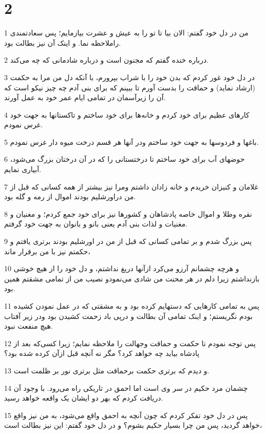 \chapter{2}

\par 1 من در دل خود گفتم: الان بیا تا تو را به عیش و عشرت بیازمایم؛ پس سعادتمندی راملاحظه نما. و اینک آن نیز بطالت بود.
\par 2 درباره خنده گفتم که مجنون است و درباره شادمانی که چه می‌کند.
\par 3 در دل خود غور کردم که بدن خود را با شراب بپرورم، با آنکه دل من مرا به حکمت (ارشاد نماید) و حماقت را بدست آورم تا ببینم که برای بنی آدم چه چیز نیکو است که آن را زیرآسمان در تمامی ایام عمر خود به عمل آورند.
\par 4 کارهای عظیم برای خود کردم و خانه‌ها برای خود ساختم و تاکستانها به جهت خود غرس نمودم.
\par 5 باغها و فردوسها به جهت خود ساختم ودر آنها هر قسم درخت میوه دار غرس نمودم.
\par 6 حوضهای آب برای خود ساختم تا درختستانی را که در آن درختان بزرگ می‌شود، آبیاری نمایم.
\par 7 غلامان و کنیزان خریدم و خانه زادان داشتم ومرا نیز بیشتر از همه کسانی که قبل از من دراورشلیم بودند اموال از رمه و گله بود.
\par 8 نقره وطلا و اموال خاصه پادشاهان و کشورها نیز برای خود جمع کردم؛ و مغنیان و مغنیات و لذات بنی آدم یعنی بانو و بانوان به جهت خود گرفتم.
\par 9 پس بزرگ شدم و بر تمامی کسانی که قبل از من در اورشلیم بودند برتری یافتم و حکمتم نیز با من برقرار ماند،
\par 10 و هر‌چه چشمانم آرزو می‌کرد ازآنها دریغ نداشتم، و دل خود را از هیچ خوشی بازنداشتم زیرا دلم در هر محنت من شادی می‌نمودو نصیب من از تمامی مشقتم همین بود.
\par 11 پس به تمامی کارهایی که دستهایم کرده بود و به مشقتی که در عمل نمودن کشیده بودم نگریستم؛ و اینک تمامی آن بطالت و در‌پی باد زحمت کشیدن بود ودر زیر آفتاب هیچ منفعت نبود.
\par 12 پس توجه نمودم تا حکمت و حماقت وجهالت را ملاحظه نمایم؛ زیرا کسی‌که بعد از پادشاه بیاید چه خواهد کرد؟ مگر نه آنچه قبل ازآن کرده شده بود؟
\par 13 و دیدم که برتری حکمت برحماقت مثل برتری نور بر ظلمت است.
\par 14 چشمان مرد حکیم در سر وی است اما احمق در تاریکی راه می‌رود. با وجود آن دریافت کردم که بهر دو ایشان یک واقعه خواهد رسید.
\par 15 پس در دل خود تفکر کردم که چون آنچه به احمق واقع می‌شود، به من نیز واقع خواهد گردید، پس من چرا بسیار حکیم بشوم؟ و در دل خود گفتم: این نیز بطالت است،
